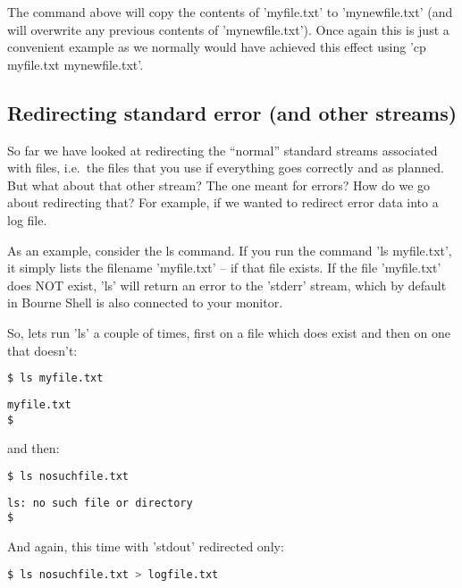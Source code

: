 The command above will copy the contents of 'myfile.txt' to 'mynewfile.txt'
(and will overwrite any previous contents of 'mynewfile.txt'). Once again this
is just a convenient example as we normally would have achieved this effect
using 'cp myfile.txt mynewfile.txt'.

\subsection{Redirecting standard error (and other streams)}
So far we have looked at redirecting the ``normal'' standard streams associated
with files, i.e.\ the files that you use if everything goes correctly and as
planned. But what about that other stream? The one meant for errors? How do we
go about redirecting that? For example, if we wanted to redirect error data
into a log file.

As an example, consider the ls command. If you run the command 'ls myfile.txt',
it simply lists the filename 'myfile.txt' -- if that file exists. If the file
'myfile.txt' does NOT exist, 'ls' will return an error to the 'stderr' stream,
which by default in Bourne Shell is also connected to your monitor.

So, lets run 'ls' a couple of times, first on a file which does exist and then
on one that doesn't:
\lstset{basicstyle=\scriptsize, numbers=left, captionpos=b, tabsize=4}
\begin{lstlisting}[caption=Listing an existing file,language={bash},
breaklines=true,xleftmargin=15pt,label=lst:Listing an existing file]
$ ls myfile.txt
\end{lstlisting}

\scriptsize
\begin{verbatim}
myfile.txt
$
\end{verbatim}
\normalsize

and then:
\lstset{basicstyle=\scriptsize, numbers=left, captionpos=b, tabsize=4}
\begin{lstlisting}[caption=Listing a non-existent file,language={bash},
breaklines=true,xleftmargin=15pt,label=lst:Listing a non-existent file]
$ ls nosuchfile.txt
\end{lstlisting}

\scriptsize
\begin{verbatim}
ls: no such file or directory 
$
\end{verbatim}
\normalsize

And again, this time with 'stdout' redirected only:
\lstset{basicstyle=\scriptsize, numbers=left, captionpos=b, tabsize=4}
\begin{lstlisting}[caption=Trying to redirect...,language={bash},
breaklines=true,xleftmargin=15pt,label=lst:Trying to redirect...]
$ ls nosuchfile.txt > logfile.txt
\end{lstlisting}

